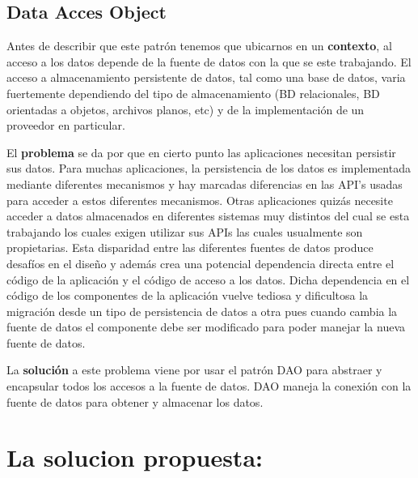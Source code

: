 \subsection{Data Acces Object}
Antes de describir que este patrón tenemos que ubicarnos en un \textbf{contexto}, al acceso a los datos depende de la fuente de datos con la que se este trabajando. El acceso a almacenamiento persistente de datos, tal como una base de datos, varia fuertemente dependiendo del tipo de almacenamiento (BD relacionales, BD orientadas a objetos, archivos planos, etc) y de la implementación de un proveedor en particular.

El \textbf{problema} se da por que en cierto punto las aplicaciones necesitan persistir sus datos. Para muchas aplicaciones, la persistencia de los datos es implementada mediante diferentes mecanismos y hay marcadas diferencias en las API's usadas para acceder a estos diferentes mecanismos. Otras aplicaciones quizás necesite acceder a datos almacenados en diferentes sistemas muy distintos del cual se esta trabajando los cuales exigen utilizar sus APIs las cuales usualmente son propietarias. Esta disparidad entre las diferentes fuentes de datos produce desafíos en el diseño y además crea una potencial dependencia directa entre el código de la aplicación y el código de acceso a los datos. Dicha dependencia en el código de los componentes de la aplicación vuelve tediosa y dificultosa la migración desde un tipo de persistencia de datos a otra pues cuando cambia la fuente de datos el componente debe ser modificado para poder manejar la nueva fuente de datos.

La \textbf{solución} a este problema viene por usar el patrón DAO para abstraer y encapsular todos los accesos a la fuente de datos. DAO maneja la conexión con la fuente de datos para obtener y almacenar los datos.
\section{La solucion propuesta: \jj}